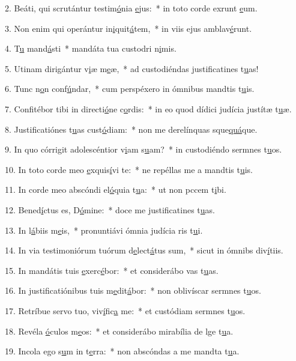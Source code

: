2. Beáti, qui scrutántur testim\uline{ó}nia \uline{e}jus:~* in toto corde exrunt \uline{e}um.\par 
3. Non enim qui operántur in\uline{i}quit\uline{á}tem,~* in viis ejus amblav\uline{é}runt.\par 
4. T\uline{u} mand\uline{á}sti~* mandáta tua custodri n\uline{i}mis.\par 
5. Utinam dirigántur v\uline{i}æ m\uline{e}æ,~* ad custodiéndas justificatines t\uline{u}as!\par 
6. Tunc n\uline{o}n conf\uline{ú}ndar,~* cum perspéxero in ómnibus mandtis t\uline{u}is.\par 
7. Confitébor tibi in directi\uline{ó}ne c\uline{o}rdis:~* in eo quod dídici judícia justítæ t\uline{u}æ.\par 
8. Justificatiónes t\uline{u}as cust\uline{ó}diam:~* non me derelínquas sque\uline{quá}que.\par 
9. In quo córrigit adolescéntior v\uline{i}am s\uline{u}am?~* in custodiéndo sermnes t\uline{u}os.\par 
10. In toto corde meo \uline{e}xquis\uline{í}vi te:~* ne repéllas me a mandtis t\uline{u}is.\par 
11. In corde meo abscóndi el\uline{ó}quia t\uline{u}a:~* ut non pccem t\uline{i}bi.\par 
12. Bened\uline{í}ctus es, D\uline{ó}mine:~* doce me justificatines t\uline{u}as.\par 
13. In l\uline{á}biis m\uline{e}is,~* pronuntiávi ómnia judícia ris t\uline{u}i.\par 
14. In via testimoniórum tuórum d\uline{e}lect\uline{á}tus sum,~* sicut in ómnibs div\uline{í}tiis.\par 
15. In mandátis tuis \uline{e}xerc\uline{é}bor:~* et considerábo vas t\uline{u}as.\par 
16. In justificatiónibus tuis m\uline{e}dit\uline{á}bor:~* non oblivíscar sermnes t\uline{u}os.\par 
17. Retríbue servo tuo, viv\uline{í}fic\uline{a} me:~* et custódiam sermnes t\uline{u}os.\par 
18. Revéla \uline{ó}culos m\uline{e}os:~* et considerábo mirabília de lge t\uline{u}a.\par 
19. Incola ego s\uline{u}m in t\uline{e}rra:~* non abscóndas a me mandta t\uline{u}a.\par 
